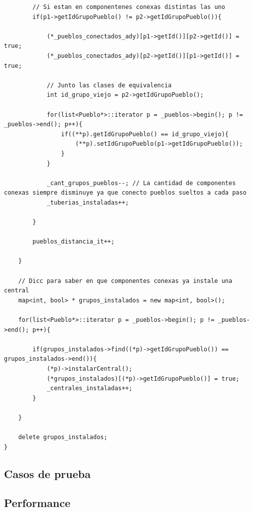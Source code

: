 \begin{lstlisting}
		// Si estan en componentenes conexas distintas las uno
		if(p1->getIdGrupoPueblo() != p2->getIdGrupoPueblo()){
		
			(*_pueblos_conectados_ady)[p1->getId()][p2->getId()] = true;
			(*_pueblos_conectados_ady)[p2->getId()][p1->getId()] = true;
			
			// Junto las clases de equivalencia
			int id_grupo_viejo = p2->getIdGrupoPueblo();
			
			for(list<Pueblo*>::iterator p = _pueblos->begin(); p != _pueblos->end(); p++){
				if((**p).getIdGrupoPueblo() == id_grupo_viejo){
					(**p).setIdGrupoPueblo(p1->getIdGrupoPueblo());
				}
			}
			
			_cant_grupos_pueblos--; // La cantidad de componentes conexas siempre disminuye ya que conecto pueblos sueltos a cada paso
			_tuberias_instaladas++;
		
		}
		
		pueblos_distancia_it++;
		
	}

	// Dicc para saber en que componentes conexas ya instale una central
	map<int, bool> * grupos_instalados = new map<int, bool>();
	
	for(list<Pueblo*>::iterator p = _pueblos->begin(); p != _pueblos->end(); p++){
		
		if(grupos_instalados->find((*p)->getIdGrupoPueblo()) == grupos_instalados->end()){
			(*p)->instalarCentral();
			(*grupos_instalados)[(*p)->getIdGrupoPueblo()] = true;
			_centrales_instaladas++;
		}
		
	}
	
	delete grupos_instalados;	
}

\end{lstlisting}

\subsection{Casos de prueba}

\subsection{Performance}
